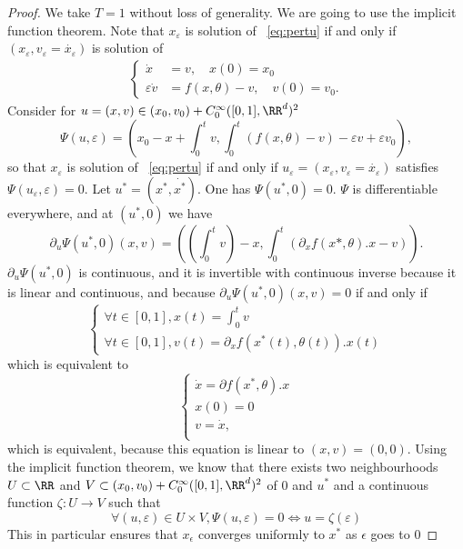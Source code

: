 \documentclass{article}
\begin{document}
\begin{proof}
We take $T=1$ without loss of generality.
We are going to use the implicit function theorem. 
Note that $x_{\varepsilon}$ is solution of ~\eqref{eq:pertu} if and only if $(x_{\varepsilon}, v_{\varepsilon} = \dot{x_{\varepsilon}})$ is solution of
\begin{equation*}
\begin{split}
\begin{cases}
\dot{x} &= v, \quad x(0) = x_0 \\
\varepsilon \dot{v} &= f(x,\theta) - v, \quad v(0) = v_0.
\end{cases}
\end{split}
\end{equation*}
Consider for $u = (x,v) \in (x_0,v_0) + C_0^{\infty}([0,1],\RR^d)^2$ 
$$\Psi(u,\varepsilon) = \left(x_0 - x +  \int_0^{t}v , \int_0^{t}(f(x,\theta) - v) - \varepsilon v + \varepsilon v_0 \right),$$
so that $x_{\varepsilon}$ is solution of ~\eqref{eq:pertu} if and only if $u_{\varepsilon} = (x_{\varepsilon}, v_{\varepsilon} = \dot{x_{\varepsilon}})$ satisfies $\Psi(u_{\varepsilon},\varepsilon) = 0.$ 
Let $u^{*} = (x^*,\dot{x^*})$.
One has $\Psi(u^{*},0) = 0.$
$\Psi$ is differentiable everywhere, and at $(u^{*},0)$ we have
$$
\partial_{u}\Psi (u^*,0)(x,v) = \left( (\int_0^{t}v) - x, \int_0^{t}(\partial_x f(x*,\theta).x - v)\right).
$$
$\partial_{u}\Psi (u^*,0)$ is continuous, and it is invertible with continuous inverse because it is linear and continuous, and because $\partial_{u}\Psi (u^*,0)(x,v) = 0$ if and only if
$$
\begin{cases}
\forall t \in [0,1], x(t) = \int_0^{t} v \\
\forall t \in [0,1], v(t) =\partial_x f(x^*(t),\theta(t)).x(t)
\end{cases}
$$
which is equivalent to 
\begin{equation*}
\begin{cases}
\dot{x}  = \partial f(x^*,\theta).x\\
x(0) = 0 \\
v  = \dot{x}, \\
\end{cases}
\end{equation*}
which is equivalent, because this equation is linear to $(x,v) = (0,0)$.
Using the implicit function theorem, we know that there exists two neighbourhoods $U \subset \RR$ and $V \subset (x_0,v_0) + C_0^{\infty}([0,1],\RR^d)^2$ of $0$ and $u^*$ and a continuous function $\zeta : U \to V$ such that
$$
\forall (u,\varepsilon) \in U \times V, \Psi(u,\varepsilon) = 0 \Leftrightarrow u = \zeta (\varepsilon)
$$
This in particular ensures that $x_{\epsilon}$ converges uniformly to $x^*$ as $\epsilon$ goes to $0$
\end{proof}
\end{document}
